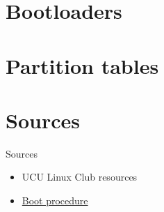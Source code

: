 \documentclass[usenames,dvipsnames,10pt,aspectratio=169]{beamer}
\begin{document}


\section{Bootloaders}

\section{Partition tables}

\section{Sources}
\begin{frame}{Sources}
    \begin{itemize}
        \item UCU Linux Club resources
        \item \href{https://www.freecodecamp.org/news/uefi-vs-bios/}{Boot procedure}
    \end{itemize}
\end{frame}
\end{document}
